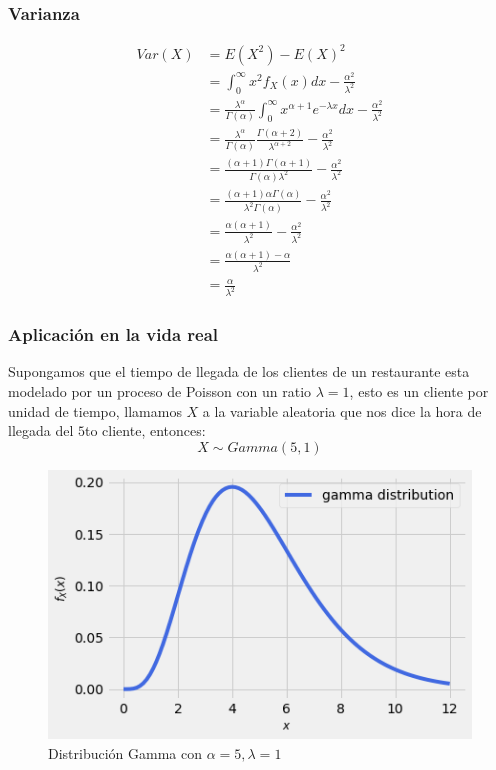 \documentclass{article}
\begin{document}
\begin{tcolorbox}[breakable]
    \subsubsection*{Varianza}
    \begin{align*}
        Var(X) &= E(X^2)-E(X)^2 \\
        &= \int_0^\infty x^2f_X(x)dx
        -\frac{\alpha^2}{\lambda^2} \\
        &= \frac{\lambda^\alpha}{\Gamma(\alpha)} \int_{0}^\infty x^{\alpha+1}e^{-\lambda x}dx
        -\frac{\alpha^2}{\lambda^2} \\
        &= \frac{\lambda^\alpha}{\Gamma(\alpha)} \frac{\Gamma(\alpha+2)}{\lambda^{\alpha+2}} 
        -\frac{\alpha^2}{\lambda^2} \\
        &= \frac{(\alpha+1)\Gamma(\alpha+1)}{\Gamma(\alpha)\lambda^2}
        -\frac{\alpha^2}{\lambda^2} \\
        &= \frac{(\alpha+1)\alpha \Gamma(\alpha)}{\lambda^2 \Gamma(\alpha)}
        -\frac{\alpha^2}{\lambda^2} \\
        &= \frac{\alpha(\alpha+1)}{\lambda^2} -\frac{\alpha^2}{\lambda^2} \\
        &= \frac{\alpha(\alpha+1)-\alpha}{\lambda^2} \\
        &= \frac{\alpha}{\lambda^2}
    \end{align*}
    \subsubsection*{Aplicación en la vida real}
    Supongamos que el tiempo de llegada de los clientes de un restaurante 
    esta modelado por un proceso de Poisson con un ratio $\lambda=1$, esto es un cliente por unidad de tiempo,
    llamamos $X$ a la variable aleatoria que nos dice la hora de llegada del $5$to cliente, entonces: 
    \[ X \sim Gamma(5,1) \]
    \begin{figure}[H]
        \centering
        \includegraphics[scale=0.7]{images/p7_gamma.png}
        \caption{Distribución Gamma con $\alpha=5, \lambda=1$}
    \end{figure}

\end{tcolorbox}
\end{document}
